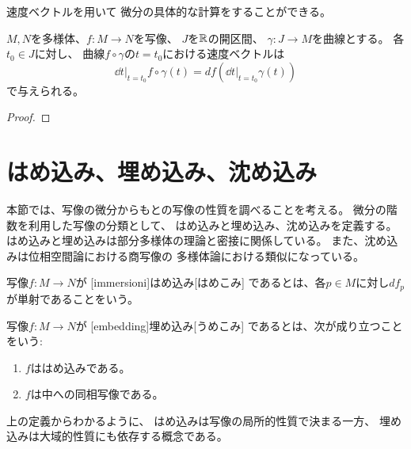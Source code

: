 \documentclass[report]{jlreq}
\begin{document}
速度ベクトルを用いて
微分の具体的な計算をすることができる。

\begin{proposition}
    $M, N$を多様体、$f \colon M \to N$を{\smooth}写像、
    $J$を$\mathbb{R}$の開区間、
    $\gamma \colon J \to M$を{\smooth}曲線とする。
    各$t_0 \in J$に対し、
    曲線$f \circ \gamma$の$t = t_0$における速度ベクトルは
    \begin{equation}
        \dd{t}\bigg|_{t = t_0} f \circ \gamma (t)
            = df\left(\dd{t}\bigg|_{t = t_0} \gamma(t) \right)
    \end{equation}
    で与えられる。
\end{proposition}

\begin{proof}
    \TODO{}
\end{proof}


%
\section{はめ込み、埋め込み、沈め込み}

本節では、写像の微分からもとの写像の性質を調べることを考える。
微分の階数を利用した写像の分類として、
はめ込みと埋め込み、沈め込みを定義する。
はめ込みと埋め込みは部分多様体の理論と密接に関係している。
また、沈め込みは位相空間論における商写像の
多様体論における類似になっている。

\begin{definition}[はめ込み]
    {\smooth}写像$f \colon M \to N$が
    [immersioni]{はめ込み}[はめこみ]
    であるとは、各$p \in M$に対し$df_p$が単射であることをいう。
\end{definition}

\begin{definition}[埋め込み]
    {\smooth}写像$f \colon M \to N$が
    [embedding]{埋め込み}[うめこみ]
    であるとは、次が成り立つことをいう:
    \begin{enumerate}
        \item $f$ははめ込みである。
        \item $f$は中への同相写像である。
    \end{enumerate}
\end{definition}

上の定義からわかるように、
はめ込みは{\smooth}写像の局所的性質で決まる一方、
埋め込みは大域的性質にも依存する概念である。
\end{document}
